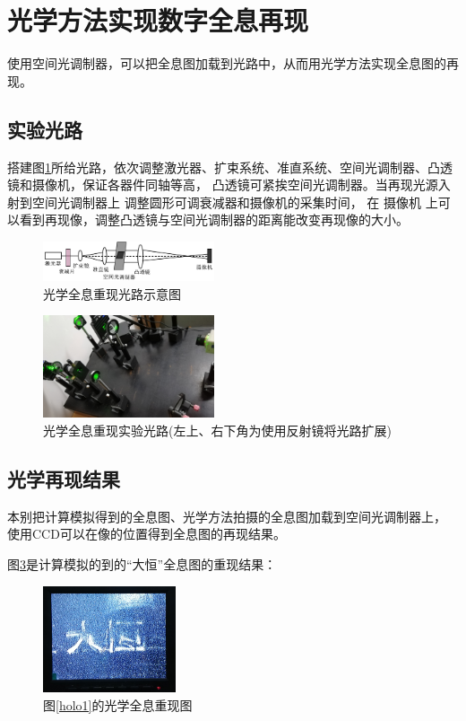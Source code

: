 \documentclass[10pt,a4paper,twocolumn,twoside,UTF8]{ctexart}
\begin{document}
	\section{光学方法实现数字全息再现}
		使用空间光调制器，可以把全息图加载到光路中，从而用光学方法实现全息图的再现。

		\subsection{实验光路}
		搭建图\ref{eq2show}所给光路，依次调整激光器、扩束系统、准直系统、空间光调制器、凸透镜和摄像机，保证各器件同轴等高， 凸透镜可紧挨空间光调制器。当再现光源入射到空间光调制器上 调整圆形可调衰减器和摄像机的采集时间， 在 摄像机 上可以看到再现像，调整凸透镜与空间光调制器的距离能改变再现像的大小。
		\begin{figure}[H]
			\centering
			\includegraphics[width=0.45\textwidth]{img//eq22.jpg}
			\caption{光学全息重现光路示意图}
			\label{eq2show}
		\end{figure}
		\begin{figure}[H]
			\centering
			\includegraphics[width=0.45\textwidth]{img//eq2.jpg}
			\caption{光学全息重现实验光路(左上、右下角为使用反射镜将光路扩展)}
			\label{eq2}
		\end{figure}

		\subsection{光学再现结果}
		本别把计算模拟得到的全息图、光学方法拍摄的全息图加载到空间光调制器上， 使用CCD可以在像的位置得到全息图的再现结果。

		图\ref{holorel11}是计算模拟的到的“大恒”全息图的重现结果：
		\begin{figure}[H]
			\centering
			\includegraphics[width=0.35\textwidth]{img//1.4.jpg}
			\caption{图\ref{holo1}的光学全息重现图}
			\label{holorel11}
		\end{figure}
\end{document}
